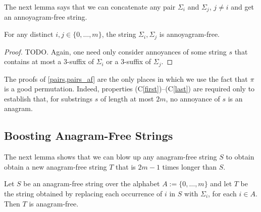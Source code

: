 \documentclass[kpfonts]{patmorin}
\newcommand{\condref}[1]{(C\ref{#1})}
\begin{document}
The next lemma says that we can concatenate any pair $\Sigma_i$ and $\Sigma_j$, $j\neq i$ and get an annoyagram-free string.

\begin{lem}\label{pairs_anf}
    For any distinct $i,j\in\{0,\ldots,m\}$, the string $\Sigma_i,\Sigma_j$ is annoyagram-free.
\end{lem}

\begin{proof}
    TODO.  Again, one need only consider annoyances of some string $s$ that contains at most a $3$-suffix of $\Sigma_i$ or a $3$-suffix of $\Sigma_j$.
\end{proof}

The proofs of \cref{pairs,pairs_af} are the only places in which we use the fact that $\pi$ is a good permutation.  Indeed, properties \condref{first}--\condref{last} are required only to establish that, for substrings $s$ of length at most $2m$, no annoyance of $s$ is an anagram.

\subsection{Boosting Anagram-Free Strings}

The next lemma shows that we can blow up any anagram-free string $S$ to obtain obtain a new anagram-free string $T$ that is $2m-1$ times longer than $S$.

\begin{lem}\label{blow_up_af}
    Let $S$ be an anagram-free string over the alphabet $A:=\{0,\ldots,m\}$ and let $T$ be the string obtained by replacing each occurrence of $i$ in $S$ with $\Sigma_i$, for each $i\in A$.  Then $T$ is anagram-free.
\end{lem}
\end{document}
